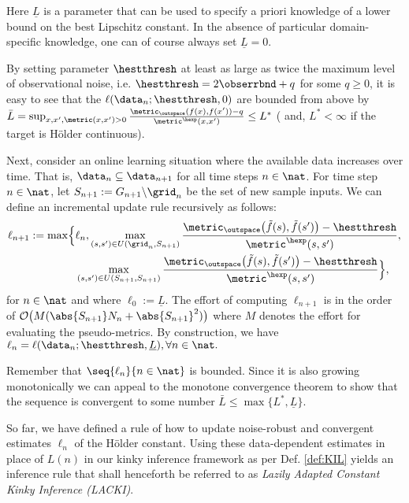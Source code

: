 %
Here $\underline L$ is a parameter that can be used to specify a priori knowledge of a lower bound on the best Lipschitz constant. In the absence of particular domain-specific knowledge, one can of course always set $\underline L =0$.
%
\begin{rem} \label{rem:bndedlipconstestimates}
By setting parameter $\hestthresh$ at least as large as twice the maximum level of observational noise, i.e. $\hestthresh = 2 \obserrbnd + q$ for some $q\geq0$, it is easy to see that the $\ell(\data_n;\hestthresh,0)$ are bounded from above by $\bar L  =\sup_{x,x', \metric(x,x') >0} \frac{\metric_\outspace(f(x), f(x'))   -q}{\metric^\hexp(x,x')} \leq L^* $ ( and,  $L^* < \infty$ if the target is H\"older continuous). 
\end{rem}
%
Next, consider an online learning situation where the available data increases over time. 
That is, $\data_n \subseteq \data_{n+1}$ for all time steps $n \in \nat$. 
For time step $n \in \nat$, let $S_{n+1} := G_{n+1} \backslash \grid_n$ be the set of new sample inputs.
We can define an incremental update rule recursively as follows: 
\begin{align} \label{eq:Hoelconstlazyupdateincr_main}
\ell_{n+1} := \max\Bigl\{ & \ell_n, \max_{(s,s') \in U(\grid_n, S_{n+1})} \frac{\metric_\outspace\bigl(\tilde f(s),\tilde f(s')\bigr) - \hestthresh}{\metric^\hexp(s,s')},\\
&\max_{(s,s') \in U(S_{n+1}, S_{n+1})} \frac{\metric_\outspace\bigl(\tilde f(s),\tilde f(s')\bigr) - \hestthresh}{\metric^\hexp(s,s')} \Bigr\},
\end{align} for $n \in \nat$ 
and where 
$\ell_0 := \underline L$. 
The effort of computing $\ell_{n+1}$ is in the order of $\mathcal O\bigl(M (\abs{S_{n+1}} N_n+ \abs{S_{n+1}}^2)\bigr)$ where $M$ denotes the effort for evaluating the pseudo-metrics.
By construction, we have $\ell_n =\ell(\mathcal \data_n;\hestthresh,\underline L), \forall n \in \nat.$ 

\begin{rem}\label{rem:convlipconstestimates}
Remember that $\seq{\ell_n}{n\in \nat}$ is bounded. Since it is also growing monotonically we can appeal to the monotone convergence theorem to show that the sequence is convergent to some number $\bar L \leq \max\{L^*,\underline L\}$.
\end{rem}

So far, we have defined a rule of how to update noise-robust and convergent estimates $\ell_n$ of the H\"older constant. Using these data-dependent estimates in place of $L(n)$ in our kinky inference framework as per Def. \ref{def:KIL} yields an inference rule that shall henceforth be referred to as \textit{Lazily Adapted Constant Kinky Inference (LACKI)}.

